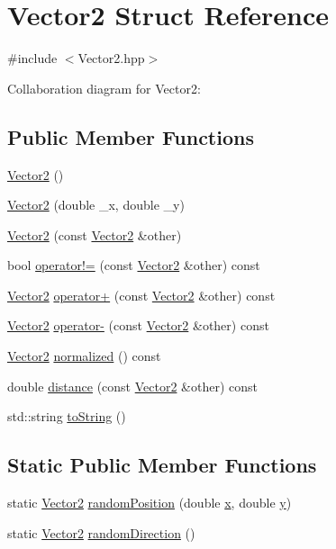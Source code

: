 \hypertarget{struct_vector2}{}\section{Vector2 Struct Reference}
\label{struct_vector2}


{\ttfamily \#include $<$Vector2.\+hpp$>$}



Collaboration diagram for Vector2\+:
\subsection*{Public Member Functions}
\begin{DoxyCompactItemize}
\item 
\mbox{\hyperlink{struct_vector2_a22104d1809be26a419ef1f959e3761bf}{Vector2}} ()
\item 
\mbox{\hyperlink{struct_vector2_a861062b13bd0e92d50b3ffd90c9edd77}{Vector2}} (double \+\_\+x, double \+\_\+y)
\item 
\mbox{\hyperlink{struct_vector2_ac0c70e89b089fb619dae62c32ccde4ec}{Vector2}} (const \mbox{\hyperlink{struct_vector2}{Vector2}} \&other)
\item 
bool \mbox{\hyperlink{struct_vector2_af3b049c981a79bd60495b6362aa6392b}{operator!=}} (const \mbox{\hyperlink{struct_vector2}{Vector2}} \&other) const
\item 
\mbox{\hyperlink{struct_vector2}{Vector2}} \mbox{\hyperlink{struct_vector2_a53bdaa4ea8e1504f8a78ac78e6f151bf}{operator+}} (const \mbox{\hyperlink{struct_vector2}{Vector2}} \&other) const
\item 
\mbox{\hyperlink{struct_vector2}{Vector2}} \mbox{\hyperlink{struct_vector2_a9f6650ee1529209532c14fc0e4e97a6a}{operator-\/}} (const \mbox{\hyperlink{struct_vector2}{Vector2}} \&other) const
\item 
\mbox{\hyperlink{struct_vector2}{Vector2}} \mbox{\hyperlink{struct_vector2_a1e0be0f2d578e8b5d0b8f95a9f8b6626}{normalized}} () const
\item 
double \mbox{\hyperlink{struct_vector2_a75a29091c7c6f2f38e987ed2c62283c8}{distance}} (const \mbox{\hyperlink{struct_vector2}{Vector2}} \&other) const
\item 
std\+::string \mbox{\hyperlink{struct_vector2_abcf7d729573613553822f965c3b9a3d2}{to\+String}} ()
\end{DoxyCompactItemize}
\subsection*{Static Public Member Functions}
\begin{DoxyCompactItemize}
\item 
static \mbox{\hyperlink{struct_vector2}{Vector2}} \mbox{\hyperlink{struct_vector2_a13b12c4d8b92bbc3de6fca42cb7a2749}{random\+Position}} (double \mbox{\hyperlink{struct_vector2_a61d73d9036ccbb3257fbe595c014a1d0}{x}}, double \mbox{\hyperlink{struct_vector2_a4df9b2a8e79e6e30a7a3b34722d8b8b8}{y}})
\item 
static \mbox{\hyperlink{struct_vector2}{Vector2}} \mbox{\hyperlink{struct_vector2_a4ae4f36c515bda9939cfe36e58b25f45}{random\+Direction}} ()
\end{DoxyCompactItemize}
